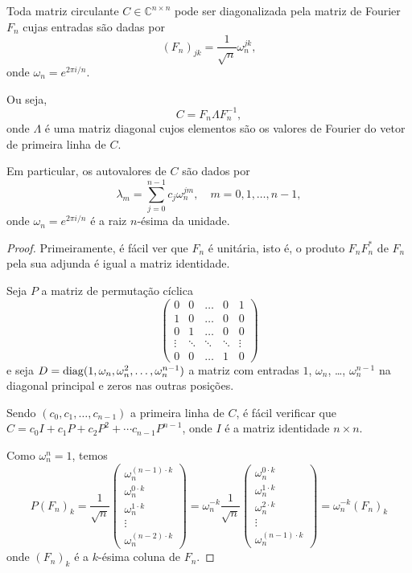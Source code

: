 \begin{theorem*}
  Toda matriz circulante $ C \in \mathbb{C}^{n \times n} $ pode ser diagonalizada pela matriz de Fourier $ F_n $ cujas entradas são dadas por
  \[
    (F_n)_{jk} = \frac{1}{\sqrt{n}} \omega_n^{jk},
  \]
  onde $ \omega_n = e^{2\pi i / n} $.

  Ou seja,
  \[
    C = F_n \Lambda F_n^{-1},
  \]
  onde $ \Lambda $ é uma matriz diagonal cujos elementos são os valores de Fourier do vetor de primeira linha de $ C $.

  Em particular, os autovalores de $ C $ são dados por
  \[
    \lambda_m = \sum_{j=0}^{n-1} c_j \omega_n^{jm}, \quad m = 0, 1, \dots, n-1,
  \]
  onde $ \omega_n = e^{2\pi i / n} $ é a raiz $ n $-ésima da unidade.
\end{theorem*}
\begin{proof}
  Primeiramente, é fácil ver que $F_n$ é unitária, isto é, o produto $F_n F_n^*$ de $F_n$ pela sua adjunda é igual a matriz identidade.

  Seja $P$ a matriz de permutação cíclica \[\begin{pmatrix}
      0      & 0      & \dots  & 0      & 1      \\
      1      & 0      & \dots  & 0      & 0      \\
      0      & 1      & \dots  & 0      & 0      \\
      \vdots & \ddots & \ddots & \ddots & \vdots \\
      0      & 0      & \dots  & 1      & 0
    \end{pmatrix}\] e seja $D = \operatorname{diag}(1, \omega_n, \omega_n^2, \dots, \omega_n^{n-1})$ a matriz com entradas $1$, $\omega_n$, \dots, $\omega_n^{n-1}$ na diagonal principal e zeros nas outras posições.

  Sendo $(c_0, c_1, \dots, c_{n-1})$ a primeira linha de $C$, é fácil verificar que $C = c_0 I + c_1 P + c_2 P^2 + \cdots c_{n-1} P^{n-1}$, onde $I$ é a matriz identidade $n \times n$.

  Como $\omega_n^n = 1$, temos \[ P (F_n)_k = \frac{1}{\sqrt{n}} \begin{pmatrix}
      \omega_n^{(n-1) \cdot k} \\
      \omega_n^{0 \cdot k}     \\
      \omega_n^{1 \cdot k}     \\
      \vdots                   \\
      \omega_n^{(n - 2) \cdot k}
    \end{pmatrix} = \omega_n^{-k} \frac{1}{\sqrt{n}} \begin{pmatrix}
      \omega_n^{0 \cdot k} \\
      \omega_n^{1 \cdot k} \\
      \omega_n^{2 \cdot k} \\
      \vdots               \\
      \omega_n^{(n - 1) \cdot k}
    \end{pmatrix} = \omega_n^{-k} (F_n)_k \] onde $(F_n)_k$ é a $k$-ésima coluna de $F_n$.


\end{proof}
